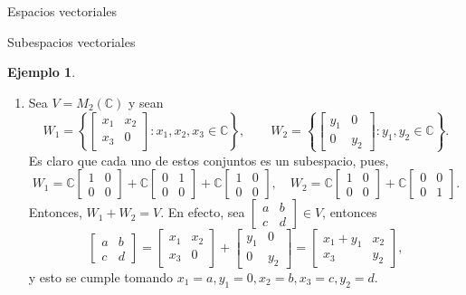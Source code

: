 \documentclass[a4paper,12pt,twoside,spanish,reqno]{amsbook}
\theoremstyle{definition}
\newtheorem{ejemplo}{Ejemplo}[section]
\theoremstyle{remark}
\newcommand{\C}{\mathbb C}
\begin{document}
\begin{chapter}{Espacios vectoriales}
\begin{section}{Subespacios vectoriales}
\begin{ejemplo}
\begin{enumerate}
            \item Sea $V = M_2(\C)$ y sean 
            \begin{equation*}
                W_1 = \left\{\begin{bmatrix} x_1&x_2\\x_3&0 \end{bmatrix}: x_1,x_2,x_3 \in \C \right\}, 
                \qquad W_2 = \left\{\begin{bmatrix} y_1&0\\0&y_2 \end{bmatrix}: y_1,y_2 \in \C \right\}.
            \end{equation*} 
            Es claro que cada uno de estos conjuntos es un subespacio, pues,
            $$
            W_1 = \C \begin{bmatrix} 1&0\\0&0 \end{bmatrix} +
            \C \begin{bmatrix} 0&1\\0&0 \end{bmatrix} +
            \C \begin{bmatrix} 1&0\\0&0 \end{bmatrix}, \quad 
            W_2 = \C \begin{bmatrix} 1&0\\0&0 \end{bmatrix} +
            \C \begin{bmatrix} 0&0\\0&1 \end{bmatrix}. 
            $$
            Entonces, $W_1 + W_2 = V$. En  efecto, sea 
            $\begin{bmatrix} a&b\\c&d\end{bmatrix} \in V$, entonces
            $$
            \begin{bmatrix} a&b\\c&d\end{bmatrix} =  \begin{bmatrix} x_1&x_2\\x_3&0 \end{bmatrix} + 
            \begin{bmatrix} y_1&0\\0&y_2 \end{bmatrix} =
            \begin{bmatrix} x_1+y_1&x_2\\x_3&y_2 \end{bmatrix},
            $$
            y esto se cumple  tomando $x_1 = a, y_1 =0,  x_2 = b, x_3= c, y_2 =d$.
            

\end{enumerate}
\end{ejemplo}
\end{section}
\end{chapter}
\end{document}
